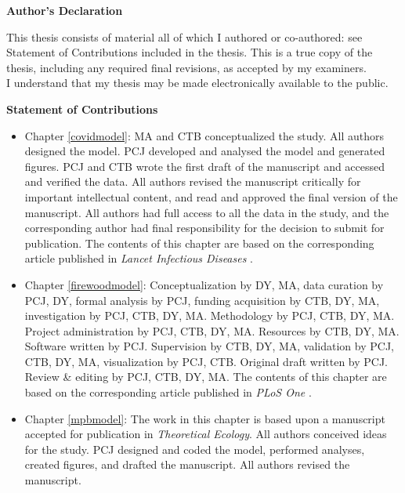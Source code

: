 \cleardoublepage

 \begin{center}\textbf{Author's Declaration}\end{center}
  
 \noindent
 This thesis consists of material all of which I authored or co-authored: see Statement of Contributions included in the thesis. This is a true copy of the thesis, including any required final revisions, as accepted by my examiners.\\
 I understand that my thesis may be made electronically available to the public.
\cleardoublepage

  \begin{center}\textbf{Statement of Contributions}\end{center}
  
  \begin{itemize}
    
   \item Chapter \ref{covidmodel}: MA and CTB conceptualized the study. All authors designed the model. PCJ developed and analysed the model and generated figures. PCJ and CTB wrote the first draft of the manuscript and accessed and verified the data. All authors revised the manuscript critically for important intellectual content, and read and approved the final version of the manuscript. All authors had full access to all the data in the study, and the corresponding author had final responsibility for the decision to submit for publication. The contents of this chapter are based on the corresponding article published in \textit{Lancet Infectious Diseases} \cite{jentsch2021prioritising}.
   
   \item Chapter \ref{firewoodmodel}: Conceptualization by DY, MA, data curation by PCJ, DY, formal analysis by PCJ, funding acquisition by CTB, DY, MA, investigation by PCJ, CTB, DY, MA. Methodology by PCJ, CTB, DY, MA. Project administration by PCJ, CTB, DY, MA. Resources by CTB, DY, MA. Software written by PCJ. Supervision by CTB, DY, MA, validation by PCJ, CTB, DY, MA, visualization by PCJ, CTB. Original draft written by PCJ. Review & editing by PCJ, CTB, DY, MA. The contents of this chapter are based on the corresponding article published in \textit{PLoS One} \cite{jentsch2020go}.

   
   \item Chapter \ref{mpbmodel}: The work in this chapter is based upon a manuscript accepted for publication in \textit{Theoretical Ecology}. All authors conceived ideas for the study. PCJ designed and coded the model, performed
   analyses, created figures, and drafted the manuscript. All authors revised the manuscript.
   

  \end{itemize}
 \cleardoublepage
 
